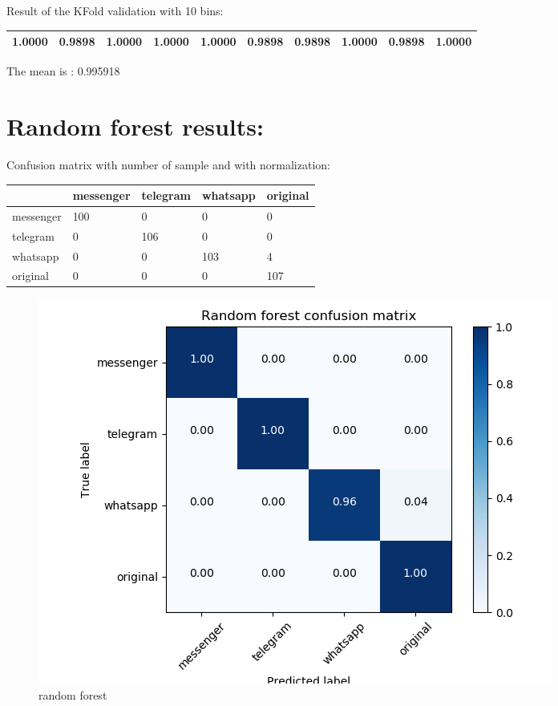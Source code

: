 Result of the KFold validation with 10 bins:
 {\def\arraystretch{1.3} 
 \begin{table}[H] 
\centering 
\begin{tabular}{|l |l |l |l |l |l |l |l |l |l |}  
\hline 
1.0000&
0.9898&
1.0000&
1.0000&
1.0000&
0.9898&
0.9898&
1.0000&
0.9898&
1.0000\\ \hline  

\end{tabular} 
\end{table} }

The mean is : 0.995918\section{Random forest results:}Confusion matrix with number of sample and with normalization:
 {\def\arraystretch{1.3} 
 \begin{table}[H] 
\centering 
\begin{tabular}{|l|l|l|l|l|} 
\hline 
  &messenger  &telegram  &whatsapp  &original  \\ \hline
messenger  &100  &0  &0  &0  \\ \hline
telegram  &0  &106  &0  &0  \\ \hline
whatsapp  &0  &0  &103  &4  \\ \hline
original  &0  &0  &0  &107  \\ \hline
\end{tabular} 
\end{table} }

 \begin{figure}[H] 
\centering 
\includegraphics[scale=.6]{images/rf_initial.png} 
\caption{random forest} 
\end{figure} 


